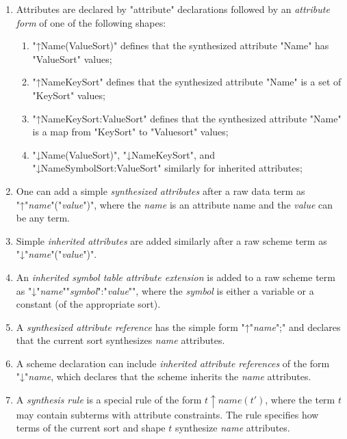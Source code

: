 \documentclass[11pt]{article} %
\begin{document}
\begin{manual}\label{man:attributes}\leavevmode
  \begin{enumerate}

  \item Attributes are declared by "attribute" declarations followed by an \emph{attribute form} of
    one of the following shapes:
    \begin{enumerate}
    \item "↑Name(ValueSort)" defines that the synthesized attribute "Name" has "ValueSort" values;
    \item "↑Name{KeySort}" defines that the synthesized attribute "Name" is a set of "KeySort" values;
    \item "↑Name{KeySort:ValueSort}" defines that the synthesized attribute "Name" is a map from
      "KeySort" to "Valuesort" values;
    \item "↓Name(ValueSort)", "↓Name{KeySort}", and "↓Name{SymbolSort:ValueSort}" similarly for
      inherited attributes;
    \end{enumerate}

  \item One can add a simple \emph{synthesized attributes} after a raw data term as
    "↑"\emph{name}"("\emph{value}")", where the \emph{name} is an attribute name and the
    \emph{value} can be any term.

  \item Simple \emph{inherited attributes} are added similarly after a raw scheme term as
    "↓"\emph{name}"("\emph{value}")".

  \item An \emph{inherited symbol table attribute extension} is added to a raw scheme term as
    "↓"\emph{name}"{"\emph{symbol}":"\emph{value}"}", where the \emph{symbol} is either a variable
    or a constant (of the appropriate sort).

  \item A \emph{synthesized attribute reference} has the simple form "↑"\emph{name}";" and declares
    that the current sort synthesizes \emph{name} attributes.

  \item A scheme declaration can include \emph{inherited attribute references} of the form
    "↓"\emph{name}, which declares that the scheme inherits the \emph{name} attributes.

  \item A \emph{synthesis rule} is a special rule of the form $t↑name(t')$, where the term $t$ may
    contain subterms with attribute constraints. The rule specifies how terms of the current sort
    and shape $t$ synthesize \emph{name} attributes.


\end{enumerate}
\end{manual}
\end{document}
